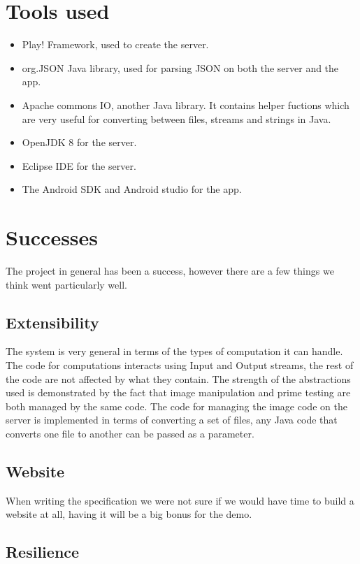 \documentclass[a4paper,10pt]{article}
\begin{document}
\section{Tools used}

\begin{itemize}
\item Play! Framework, used to create the server.
\item org.JSON Java library, used for parsing JSON on both the server and the app.
\item Apache commons IO, another Java library. It contains helper fuctions which are very useful for converting between
files, streams and strings in Java.
\item OpenJDK 8 for the server.
\item Eclipse IDE for the server.
\item The Android SDK and Android studio for the app.
\end{itemize}


\section{Successes}

The project in general has been a success, however there are a few things we think went particularly well.

\subsection{Extensibility}

The system is very general in terms of the types of computation it can handle.
The code for computations interacts using Input and Output streams, the rest of the code are not affected by what they contain.
The strength of the abstractions used is demonstrated by the fact that image manipulation and prime testing are both managed by the same code.
The code for managing the image code on the server is implemented in terms of converting a set of files, any Java code that converts one file to another can be passed as a parameter.

\subsection{Website}

When writing the specification we were not sure if we would have time to build a website at all, having it will be a big bonus for the demo.

\subsection{Resilience}
\end{document}
